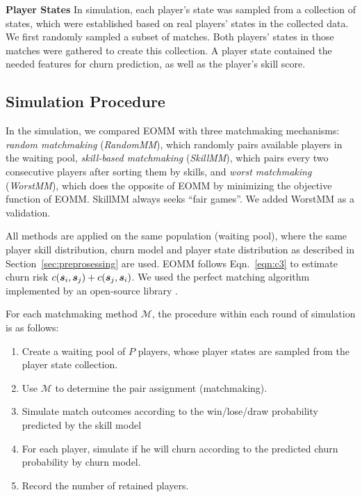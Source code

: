 \textbf{Player States} In simulation, each player's state was sampled from a collection of states, which were established based on real players' states in the collected data. We first randomly sampled a subset of matches. Both players' states in those matches were gathered to create this collection. A player state contained the needed features for churn prediction, as well as the player's skill score.


\subsection{Simulation Procedure}
In the simulation, we compared EOMM with three matchmaking mechanisms: \textit{random matchmaking} (\textit{RandomMM}), which randomly pairs available players in the waiting pool, \textit{skill-based matchmaking} (\textit{SkillMM}), which pairs every two consecutive players after sorting them by skills, and \textit{worst matchmaking} (\textit{WorstMM}), which does the opposite of EOMM by minimizing the objective function of EOMM. SkillMM always seeks ``fair games''. We added WorstMM as a validation.

All methods are applied on the same population (waiting pool), where the same player skill distribution, churn model and player state distribution as described in Section~\ref{sec:preprosessing} are used. EOMM follows Eqn.~\ref{eqn:c3} to estimate churn risk $c(\boldsymbol{s}_i, \boldsymbol{s}_j) + c(\boldsymbol{s}_j, \boldsymbol{s}_i)$. We used the perfect matching algorithm \citep{gabow1974implementation,lawler2001combinatorial} implemented by an open-source library \citep{onlineperfectmatching}.



For each matchmaking method $\mathcal{M}$, the procedure within each round of simulation is as follows:
\begin{enumerate}
\item Create a waiting pool of $P$ players, whose player states are sampled from the player state collection.
\item Use $\mathcal{M}$ to determine the pair assignment (matchmaking).
\item Simulate match outcomes according to the win/lose/draw probability predicted by the skill model
\item For each player, simulate if he will churn according to the predicted churn probability by churn model.
\item Record the number of retained players.
\end{enumerate}

